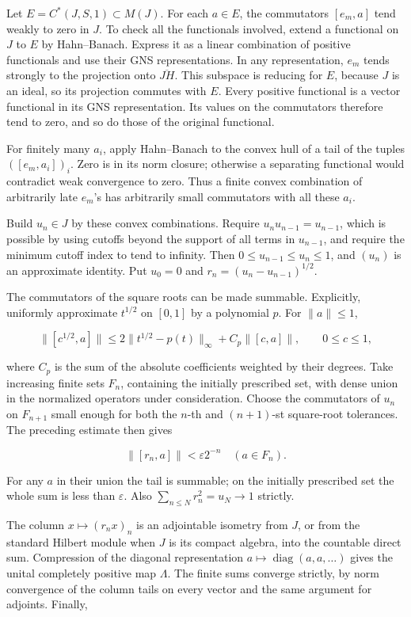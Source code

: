 \documentclass[
  11pt,
]{article}
\begin{document}
Let \(E=C^*(J,S,1)\subset M(J)\). For each \(a\in E\), the commutators
\([e_m,a]\) tend weakly to zero in \(J\). To check all the functionals
involved, extend a functional on \(J\) to \(E\) by Hahn--Banach. Express
it as a linear combination of positive functionals and use their GNS
representations. In any representation, \(e_m\) tends strongly to the
projection onto \(\overline{JH}\). This subspace is reducing for \(E\),
because \(J\) is an ideal, so its projection commutes with \(E\). Every
positive functional is a vector functional in its GNS representation.
Its values on the commutators therefore tend to zero, and so do those of
the original functional.

For finitely many \(a_i\), apply Hahn--Banach to the convex hull of a
tail of the tuples \(([e_m,a_i])_i\). Zero is in its norm closure;
otherwise a separating functional would contradict weak convergence to
zero. Thus a finite convex combination of arbitrarily late \(e_m\)'s has
arbitrarily small commutators with all these \(a_i\).

Build \(u_n\in J\) by these convex combinations. Require
\(u_nu_{n-1}=u_{n-1}\), which is possible by using cutoffs beyond the
support of all terms in \(u_{n-1}\), and require the minimum cutoff
index to tend to infinity. Then \(0\leq u_{n-1}\leq u_n\leq1\), and
\((u_n)\) is an approximate identity. Put \(u_0=0\) and
\(r_n=(u_n-u_{n-1})^{1/2}\).

The commutators of the square roots can be made summable. Explicitly,
uniformly approximate \(t^{1/2}\) on \([0,1]\) by a polynomial \(p\).
For \(\|a\|\leq1\),

\[
\|[c^{1/2},a]\|
\leq2\|t^{1/2}-p(t)\|_\infty
+C_p\|[c,a]\|,\qquad0\leq c\leq1,
\]

where \(C_p\) is the sum of the absolute coefficients weighted by their
degrees. Take increasing finite sets \(F_n\), containing the initially
prescribed set, with dense union in the normalized operators under
consideration. Choose the commutators of \(u_n\) on \(F_{n+1}\) small
enough for both the \(n\)-th and \((n+1)\)-st square-root tolerances.
The preceding estimate then gives

\[
\|[r_n,a]\|<\varepsilon2^{-n}
\quad(a\in F_n).
\]

For any \(a\) in their union the tail is summable; on the initially
prescribed set the whole sum is less than \(\varepsilon\). Also
\(\sum_{n\leq N}r_n^2=u_N\to1\) strictly.

The column \(x\mapsto(r_nx)_n\) is an adjointable isometry from \(J\),
or from the standard Hilbert module when \(J\) is its compact algebra,
into the countable direct sum. Compression of the diagonal
representation \(a\mapsto\operatorname{diag}(a,a,\ldots)\) gives the
unital completely positive map \(\Lambda\). The finite sums converge
strictly, by norm convergence of the column tails on every vector and
the same argument for adjoints. Finally,
\end{document}
